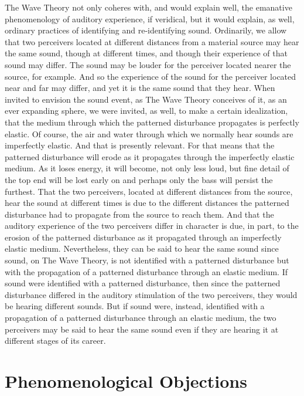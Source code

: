 The Wave Theory not only coheres with, and would explain well, the emanative phenomenology of auditory experience, if veridical, but it would explain, as well, ordinary practices of identifying and re-identifying sound. Ordinarily, we allow that two perceivers located at different distances from a material source may hear the same sound, though at different times, and though their experience of that sound may differ. The sound may be louder for the perceiver located nearer the source, for example. And so the experience of the sound for the perceiver located near and far may differ, and yet it is the same sound that they hear. When invited to envision the sound event, as The Wave Theory conceives of it, as an ever expanding sphere, we were invited, as well, to make a certain idealization, that the medium through which the patterned disturbance propagates is perfectly elastic. Of course, the air and water through which we normally hear sounds are imperfectly elastic. And that is presently relevant. For that means that the patterned disturbance will erode as it propagates through the imperfectly elastic medium. As it loses energy, it will become, not only less loud, but fine detail of the top end will be lost early on and perhaps only the bass will persist the furthest. That the two perceivers, located at different distances from the source, hear the sound at different times is due to the different distances the patterned disturbance had to propagate from the source to reach them. And that the auditory experience of the two perceivers differ in character is due, in part, to the erosion of the patterned disturbance as it propagated through an imperfectly elastic medium. Nevertheless, they can be said to hear the same sound since sound, on The Wave Theory, is not identified with a patterned disturbance but with the propagation of a patterned disturbance through an elastic medium. If sound were identified with a patterned disturbance, then since the patterned disturbance differed in the auditory stimulation of the two perceivers, they would be hearing different sounds. But if sound were, instead, identified with a propagation of a patterned disturbance through an elastic medium, the two perceivers may be said to hear the same sound even if they are hearing it at different stages of its career.


\section{Phenomenological Objections} %
\label{sec:phenomenological_objections}

